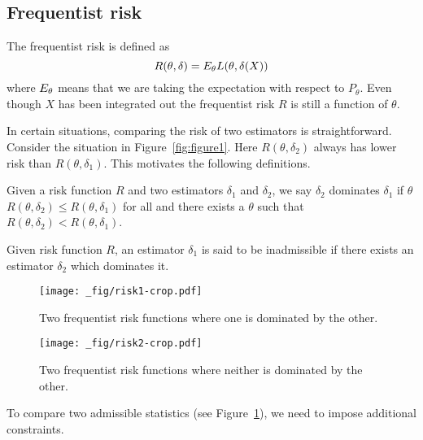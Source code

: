 \documentclass[twoside]{article}
\begin{document}
\subsection{Frequentist risk}

The frequentist risk is defined as
\begin{equation*}
R(\theta, \delta) = E_{\theta} L(\theta, \delta(X))
\end{equation*}
where $E_{\theta}$ means that we are taking the expectation with respect to
$P_{\theta}$. Even though $X$ has been integrated out the frequentist risk
$R$ is still a function of $\theta$.

In certain situations, comparing the risk of two estimators is straightforward.
Consider the situation in Figure~\ref{fig:figure1}.  Here $R(\theta, \delta_2)$
always has lower risk than $R(\theta, \delta_1)$.  This motivates the following
definitions.

\begin{definition}\label{def:dominate}
  Given a risk function $R$ and two estimators $\delta_1$ and $\delta_2$,
  we say $\delta_2$ dominates $\delta_1$ if $\theta$ $R(\theta, \delta_2)
  \leq R(\theta, \delta_1)$ for all and there exists a $\theta$ such that $R(\theta,
  \delta_2) < R(\theta, \delta_1)$.
\end{definition}

\begin{definition}\label{def:inadmissable}
  Given risk function $R$, an estimator $\delta_1$ is said to be
  inadmissible if there exists an estimator $\delta_2$ which dominates it. 
\end{definition}

\begin{figure}[ht]
\begin{minipage}[b]{0.45\linewidth}
\centering
\texttt{[image: \_fig/risk1-crop.pdf]}
\caption{Two frequentist risk functions where one is dominated by the other.}
\label{fig:figure1}
\end{minipage}
\hspace{0.5cm}
\begin{minipage}[b]{0.45\linewidth}
\centering
\texttt{[image: \_fig/risk2-crop.pdf]}
\caption{Two frequentist risk functions where neither is dominated by the other.}
\label{fig:figure2}
\end{minipage}
\end{figure}

To compare two admissible statistics (see Figure~\ref{fig:figure2}), we need
to impose additional constraints.
\end{document}
